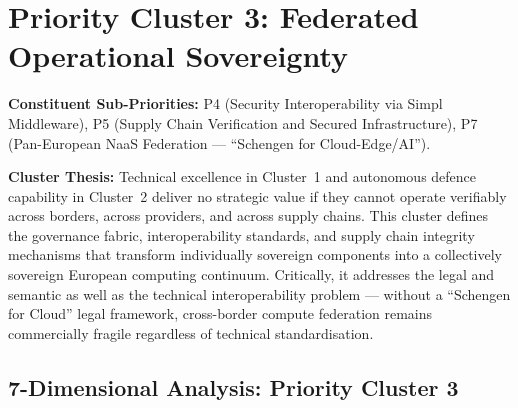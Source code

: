 
\newpage
\section{Priority Cluster 3: Federated Operational Sovereignty}
\label{sec:cluster3}

\noindent\textbf{Constituent Sub-Priorities:} P4 (Security Interoperability via Simpl
Middleware), P5 (Supply Chain Verification and Secured Infrastructure), P7 (Pan-European
NaaS Federation --- ``Schengen for Cloud-Edge/AI'').

\medskip
\noindent\textbf{Cluster Thesis:} Technical excellence in Cluster~1 and autonomous
defence capability in Cluster~2 deliver no strategic value if they cannot operate
verifiably across borders, across providers, and across supply chains. This cluster
defines the governance fabric, interoperability standards, and supply chain integrity
mechanisms that transform individually sovereign components into a collectively sovereign
European computing continuum. Critically, it addresses the legal and semantic as well as
the technical interoperability problem --- without a ``Schengen for Cloud'' legal framework,
cross-border compute federation remains commercially fragile regardless of technical
standardisation.

\subsection*{7-Dimensional Analysis: Priority Cluster 3}

